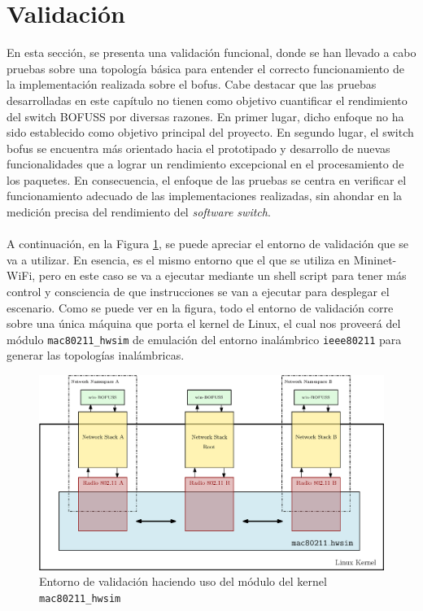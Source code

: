 \section{Validación}
\label{sec:vali}

En esta sección, se presenta una validación funcional, donde se han llevado a cabo pruebas sobre una topología básica para entender el correcto funcionamiento de la implementación realizada sobre el \gls{bofus}. Cabe destacar que las pruebas desarrolladas en este capítulo no tienen como objetivo cuantificar el rendimiento del switch BOFUSS por diversas razones. En primer lugar, dicho enfoque no ha sido establecido como objetivo principal del proyecto. En segundo lugar, el switch \gls{bofus} se encuentra más orientado hacia el prototipado y desarrollo de nuevas funcionalidades que a lograr un rendimiento excepcional en el procesamiento de los paquetes. En consecuencia, el enfoque de las pruebas se centra en verificar el funcionamiento adecuado de las implementaciones realizadas, sin ahondar en la medición precisa del rendimiento del \textit{software switch}.\\
\\
A continuación, en la Figura \ref{fig:scenario_eva}, se puede apreciar el entorno de validación que se va a utilizar. En esencia, es el mismo entorno que el que se utiliza en Mininet-WiFi, pero en este caso se va a ejecutar mediante un shell script para tener más control y consciencia de que instrucciones se van a ejecutar para desplegar el escenario. Como se puede ver en la figura, todo el entorno de validación corre sobre una única máquina que porta el kernel de Linux, el cual nos proveerá del módulo \texttt{mac80211\_hwsim} de emulación del entorno inalámbrico \texttt{ieee80211} para generar las topologías inalámbricas.\\

\begin{figure}[ht]
    \centering
    \includegraphics[width=\textwidth]{archivos/img/dev/scenario_eva.eps}
    \caption{Entorno de validación haciendo uso del módulo del kernel \texttt{mac80211\_hwsim}}
    \label{fig:scenario_eva}
\end{figure}

